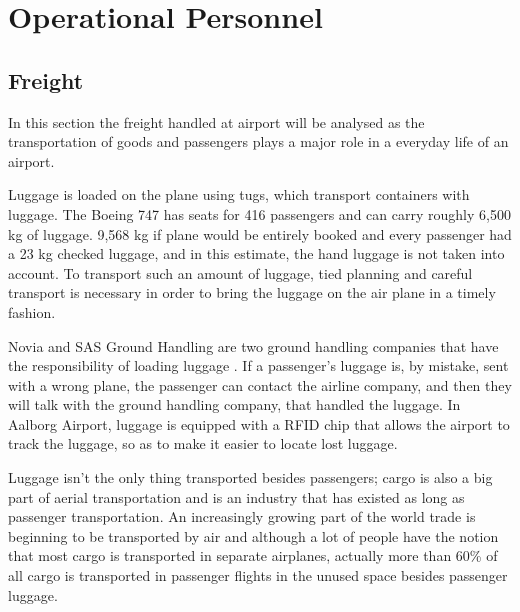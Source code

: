 \section{Operational Personnel}
\subsection{Freight}
In this section the freight handled at airport will be analysed as the transportation of goods and passengers plays a major role in a everyday life of an airport. 

Luggage is loaded on the plane using tugs, which transport containers with luggage. The Boeing 747 has seats for 416 passengers\cite{freight_boing} and can carry roughly 6,500 kg of luggage. %
9,568 kg if plane would be entirely booked and every passenger had a 23 kg checked luggage, and in this estimate, the hand luggage is not taken into account. To transport such an amount of luggage, tied planning and careful transport is necessary in order to bring the luggage on the air plane in a timely fashion. %

Novia and SAS Ground Handling are two ground handling companies that have the responsibility of loading luggage \cite{mistet_bagage}. If a passenger's luggage is, by mistake, sent with a wrong plane, the passenger can contact the airline company, and then they will talk with the ground handling company, that handled the luggage. In Aalborg Airport, luggage is equipped with a RFID chip that allows the airport to track the luggage, so as to make it easier to locate lost luggage.


Luggage isn't the only thing transported besides passengers; cargo is also a big part of aerial transportation and is an industry that has existed as long as passenger transportation. An increasingly growing part of the world trade is beginning to be transported by air and although a lot of people have the notion that most cargo is transported in separate airplanes, actually more than 60\% of all cargo is transported in passenger flights in the unused space besides passenger luggage. %


